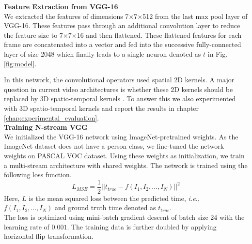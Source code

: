 
\textbf{Feature Extraction from VGG-16} \\
We extracted the features of dimensions  7$\times$7$\times$512 from the last max pool layer of VGG-16. These features pass through an additional convolution layer to reduce the feature size to 7$\times$7$\times$16 and then flattened. These flattened features for each frame are concatenated into a vector and fed into the successive fully-connected layer of size 2048 which finally leads to a single neuron denoted as $t$ in Fig. \ref{fig:model}.  

In this network, the convolutional operators used spatial 2D kernels. A major question in current video architectures is whether these 2D kernels should be replaced by 3D spatio-temporal kernels \cite{i3d}. To answer this we also experimented with 3D spatio-temporal kernels and report the results in chapter \ref{chap:experimental_evaluation}. \\

\textbf{Training N-stream VGG} \\
We initialized the VGG-16 network using ImageNet-pretrained weights. As the ImageNet dataset does not have a person class, we fine-tuned the network weights on PASCAL VOC \cite{pascalVOC} dataset. Using these weights as initialization, we train a multi-stream architecture with shared weights. The network is trained using the following loss function.
$$
L_{MSE} = \frac{1}{2}||t_{true} - f(I_1, I_2, \hdots, I_N)||^{2}
$$
Here, $L$ is the mean squared loss between the predicted time, \emph{i.e.}, $f(I_1, I_2, \hdots, I_N)$ and ground truth time denoted as $t_{true}$. \\
The loss is optimized using mini-batch gradient descent of batch size 24 with the learning rate of $0.001$. The training data is further doubled by applying horizontal flip transformation.
